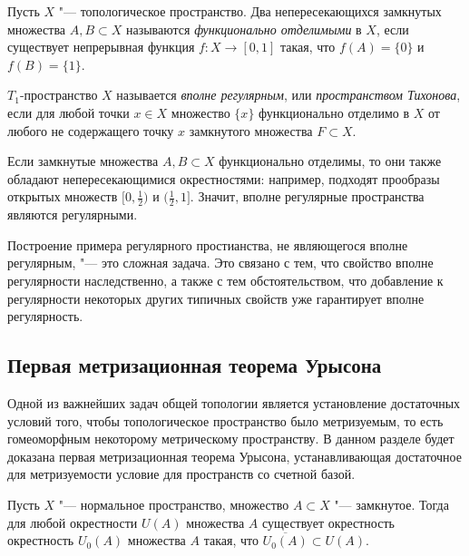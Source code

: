 \begin{definition}
    Пусть $X$ "--- топологическое пространство. Два непересекающихся замкнутых множества $A, B \subset X$ называются \textit{функционально отделимыми} в $X$, если существует непрерывная функция $f : X\rightarrow [0, 1]$ такая, что $f(A) = \{0\}$ и $f(B) = \{1\}$.
\end{definition}

\begin{definition}
    $T_1$-пространство $X$ называется \textit{вполне регулярным}, или \textit{пространством Тихонова}, если для любой точки $x \in X$ множество $\{x\}$ функционально отделимо в $X$ от любого не содержащего точку $x$ замкнутого множества $F \subset X$.
\end{definition}

\begin{note}
    Если замкнутые множества $A, B \subset X$ функционально отделимы, то они также обладают непересекающимися окрестностями: например, подходят прообразы открытых множеств $[0, \frac 12)$ и $(\frac12, 1]$. Значит, вполне регулярные пространства являются регулярными.
\end{note}

\begin{note}
    Построение примера регулярного простианства, не являющегося вполне регулярным, "--- это сложная задача. Это связано с тем, что свойство вполне регулярности наследственно, а также с тем обстоятельством, что добавление к регулярности некоторых других типичных свойств уже гарантирует вполне регулярность.
\end{note}

\subsection{Первая метризационная теорема Урысона}

\begin{note}
    Одной из важнейших задач общей топологии является установление достаточных условий того, чтобы топологическое пространство было метризуемым, то есть гомеоморфным некоторому метрическому пространству. В данном разделе будет доказана первая метризационная теорема Урысона, устанавливающая достаточное для метризуемости условие для пространств со счетной базой.
\end{note}

\begin{proposition}
    Пусть $X$ "--- нормальное пространство, множество $A \subset X$ "--- замкнутое. Тогда для любой окрестности $U(A)$ множества $A$ существует окрестность окрестность $U_0(A)$ множества $A$ такая, что $\overline{U_0(A)} \subset U(A)$.
\end{proposition}

